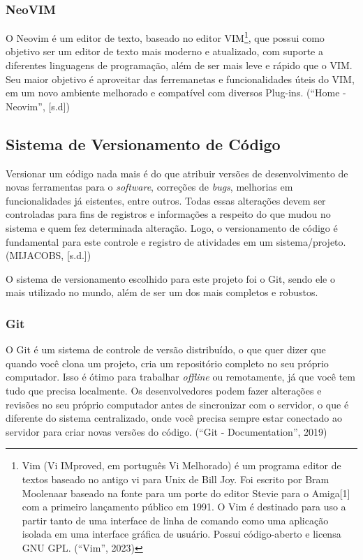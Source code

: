 \documentclass[a4paper,12pt]{article}
\begin{document}
\subsubsection{NeoVIM}
O Neovim é um editor de texto, baseado no editor VIM\footnote{
	Vim (Vi IMproved, em português Vi Melhorado) é um programa editor de textos baseado no antigo vi para Unix de Bill Joy. Foi escrito por Bram Moolenaar baseado na fonte para um porte do editor 
	Stevie para o Amiga[1] com a primeiro lançamento público em 1991. O Vim é destinado para uso a partir tanto de uma interface de linha de comando como uma aplicação isolada em uma interface gráfica de usuário.
	Possui código-aberto e licensa GNU GPL. (“Vim”, 2023)
}, que possui como objetivo ser um editor de texto mais moderno e atualizado, com suporte a diferentes linguagens de programação, além de ser mais leve e rápido que o VIM.
Seu maior objetivo é aproveitar das ferremanetas e funcionalidades úteis do VIM, em um novo ambiente melhorado e 
compatível com diversos Plug-ins. (“Home - Neovim”, [s.d])


\subsection{Sistema de Versionamento de Código}
Versionar um código nada mais é do que atribuir versões de desenvolvimento de novas ferramentas para o \textit{software}, correções de \textit{bugs}, 
melhorias em funcionalidades já eistentes, entre outros. Todas essas alterações devem ser controladas para fins de registros e informações a respeito do que mudou 
no sistema e quem fez determinada alteração. Logo, o versionamento de código é fundamental para este controle e 
registro de atividades em um sistema/projeto. (MIJACOBS, [s.d.])

O sistema de versionamento escolhido para este projeto foi o Git, sendo ele o mais utilizado no mundo, além de ser um dos mais completos e robustos.


\subsubsection{Git}
O Git é um sistema de controle de versão distribuído, o que quer dizer que quando você clona um projeto, cria um repositório completo no seu próprio computador. 
Isso é ótimo para trabalhar \textit{offline} ou remotamente, já que você tem tudo que precisa localmente. Os desenvolvedores podem fazer alterações e revisões no seu próprio 
computador antes de sincronizar com o servidor, o que é diferente do sistema centralizado, onde você precisa sempre estar conectado ao servidor para criar 
novas versões do código.  (“Git - Documentation”, 2019)
\end{document}
